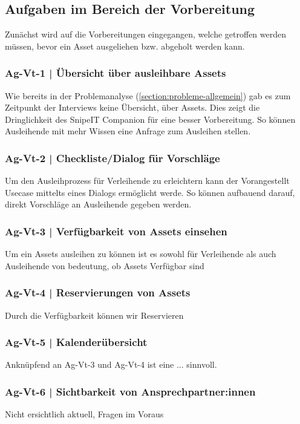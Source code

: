 
\subsection{Aufgaben im Bereich der Vorbereitung}
Zunächst wird auf die Vorbereitungen eingegangen, welche getroffen werden müssen, bevor ein Asset
ausgeliehen bzw. abgeholt werden kann.
\subsubsection{Ag-Vt-1 | Übersicht über ausleihbare Assets}
Wie bereits in der Problemanalyse (\ref{section:probleme-allgemein}) gab es zum Zeitpunkt der
Interviews keine Übersicht, über Assets. Dies zeigt die Dringlichkeit des SnipeIT Companion für eine
besser Vorbereitung. So können Ausleihende mit mehr Wissen eine Anfrage zum Ausleihen stellen. 
\subsubsection{Ag-Vt-2 | Checkliste/Dialog für Vorschläge}
Um den Ausleihprozess für Verleihende zu erleichtern kann der Vorangestellt Usecase mittelts eines
Dialogs ermöglicht werde. So können aufbauend darauf, direkt Vorschläge an Ausleihende gegeben
werden.
\subsubsection{Ag-Vt-3 | Verfügbarkeit von Assets einsehen}
Um ein Assets ausleihen zu können ist es sowohl für Verleihende als auch Ausleihende von bedeutung,
ob Assets Verfügbar sind
\subsubsection{Ag-Vt-4 | Reservierungen von Assets}
Durch die Verfügbarkeit können wir Reservieren
\subsubsection{Ag-Vt-5 | Kalenderübersicht}
Anknüpfend an Ag-Vt-3 und Ag-Vt-4 ist eine ... sinnvoll.
\subsubsection{Ag-Vt-6 | Sichtbarkeit von Ansprechpartner:innen}
Nicht ersichtlich aktuell, Fragen im Voraus 

